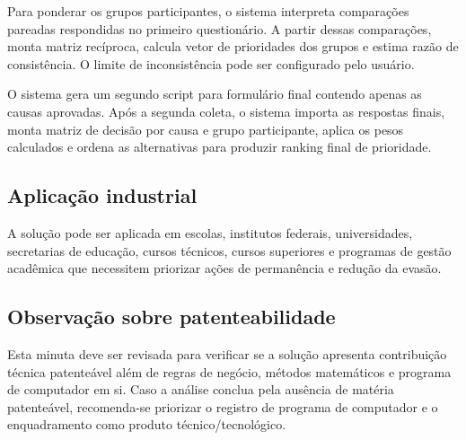 Para ponderar os grupos participantes, o sistema interpreta comparações pareadas respondidas no primeiro questionário. A partir dessas comparações, monta matriz recíproca, calcula vetor de prioridades dos grupos e estima razão de consistência. O limite de inconsistência pode ser configurado pelo usuário.

O sistema gera um segundo script para formulário final contendo apenas as causas aprovadas. Após a segunda coleta, o sistema importa as respostas finais, monta matriz de decisão por causa e grupo participante, aplica os pesos calculados e ordena as alternativas para produzir ranking final de prioridade.

\subsection{Aplicação industrial}

A solução pode ser aplicada em escolas, institutos federais, universidades, secretarias de educação, cursos técnicos, cursos superiores e programas de gestão acadêmica que necessitem priorizar ações de permanência e redução da evasão.

\subsection{Observação sobre patenteabilidade}

Esta minuta deve ser revisada para verificar se a solução apresenta contribuição técnica patenteável além de regras de negócio, métodos matemáticos e programa de computador em si. Caso a análise conclua pela ausência de matéria patenteável, recomenda-se priorizar o registro de programa de computador e o enquadramento como produto técnico/tecnológico.
